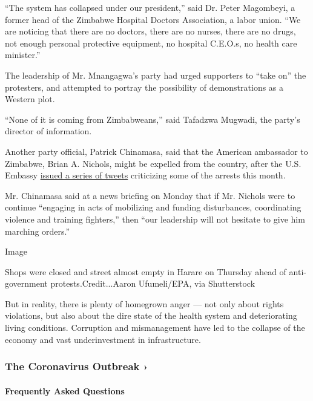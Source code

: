 ``The system has collapsed under our president,'' said Dr. Peter
Magombeyi, a former head of the Zimbabwe Hospital Doctors Association, a
labor union. ``We are noticing that there are no doctors, there are no
nurses, there are no drugs, not enough personal protective equipment, no
hospital C.E.O.s, no health care minister.''

The leadership of Mr. Mnangagwa's party had urged supporters to ``take
on'' the protesters, and attempted to portray the possibility of
demonstrations as a Western plot.

``None of it is coming from Zimbabweans,'' said Tafadzwa Mugwadi, the
party's director of information.

Another party official, Patrick Chinamasa, said that the American
ambassador to Zimbabwe, Brian A. Nichols, might be expelled from the
country, after the U.S. Embassy
\href{https://twitter.com/usembassyharare/status/1285856222579699713?s=20}{issued
a series of tweets} criticizing some of the arrests this month.

Mr. Chinamasa said at a news briefing on Monday that if Mr. Nichols were
to continue ``engaging in acts of mobilizing and funding disturbances,
coordinating violence and training fighters,'' then ``our leadership
will not hesitate to give him marching orders.''

Image

Shops were closed and street almost empty in Harare on Thursday ahead of
anti-government protests.Credit...Aaron Ufumeli/EPA, via Shutterstock

But in reality, there is plenty of homegrown anger --- not only about
rights violations, but also about the dire state of the health system
and deteriorating living conditions. Corruption and mismanagement have
led to the collapse of the economy and vast underinvestment in
infrastructure.

\href{https://www.nytimes3xbfgragh.onion/news-event/coronavirus?action=click\&pgtype=Article\&state=default\&region=MAIN_CONTENT_3\&context=storylines_faq}{}

\hypertarget{the-coronavirus-outbreak-}{%
\subsubsection{The Coronavirus Outbreak
›}\label{the-coronavirus-outbreak-}}

\hypertarget{frequently-asked-questions}{%
\paragraph{Frequently Asked
Questions}\label{frequently-asked-questions}}

